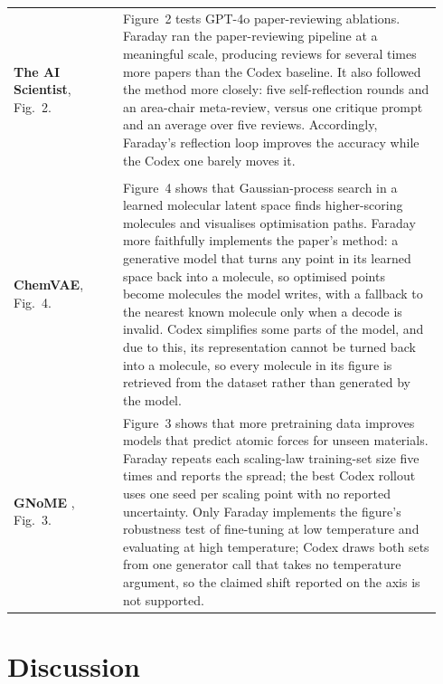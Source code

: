 \documentclass[garamond,a4paper]{inherent}
\newcommand{\faradayname}{Faraday\xspace}
\begin{document}
\begin{table}[p!]
\begin{tabular}{@{}p{0.24\linewidth} p{0.70\linewidth}@{}}
        \\
        \addlinespace[3pt]
        \textbf{The AI Scientist}\newline\cite{sakanaaiscientist}, Fig.~2.
        & Figure~2 tests GPT-4o paper-reviewing ablations. \faradayname ran the paper-reviewing pipeline at a meaningful scale, producing reviews for several times more papers than the Codex baseline. It also followed the method more closely: five self-reflection rounds and an area-chair meta-review, versus one critique prompt and an average over five reviews. Accordingly, \faradayname's reflection loop improves the accuracy while the Codex one barely moves it. \\
        \addlinespace[3pt]
        \midrule
        \midrule
        \multicolumn{2}{@{}l}{\textit{\textbf{AI-for-science (test)}}} \\
        \midrule
        \textbf{ChemVAE}\newline\cite{chemvae}, Fig.~4.
        & Figure~4 shows that Gaussian-process search in a learned molecular latent space finds higher-scoring molecules and visualises optimisation paths. \faradayname more faithfully implements the paper's method: a generative model that turns any point in its learned space back into a molecule, so optimised points become molecules the model writes, with a fallback to the nearest known molecule only when a decode is invalid. Codex simplifies some parts of the model, and due to this, its representation cannot be turned back into a molecule, so every
        molecule in its figure is retrieved from the dataset rather than generated by the model. \\
        \addlinespace[3pt]
        \textbf{GNoME} \newline \cite{gnome}, Fig.~3.
        & Figure~3 shows that more pretraining data improves models that predict atomic forces for unseen materials. \faradayname repeats each scaling-law training-set size five times and reports the spread; the best Codex rollout uses one seed per scaling point with no reported uncertainty. Only \faradayname implements the figure's robustness test of fine-tuning at low temperature and evaluating at high temperature; Codex draws both sets from one generator call that takes no temperature argument, so the claimed shift reported on the axis is not supported. \\
        \bottomrule
    \end{tabular}
\end{table}

\FloatBarrier
\section{Discussion}
\end{document}
